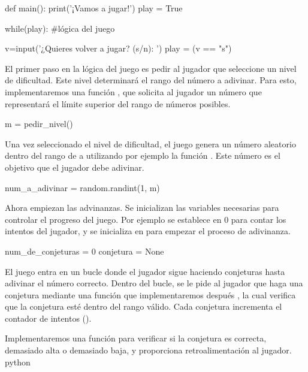 \begin{python}
def main():
    print('¡Vamos a jugar!')
    play = True
    
    while(play):
        #lógica del juego

        v=input('¿Quieres volver a jugar? (s/n): ')
        play = (v == "s")
\end{python}


El primer paso en la lógica del juego es pedir al jugador que seleccione un nivel de dificultad. Este nivel determinará el rango del número a adivinar. Para esto, implementaremos una función , que solicita al jugador un número que representará el límite superior del rango de números posibles.

\begin{python}
m = pedir_nivel()
\end{python}

Una vez seleccionado el nivel de dificultad, el juego genera un número aleatorio dentro del rango de  a  utilizando por ejemplo la función . Este número es el objetivo que el jugador debe adivinar.

\begin{python}
num_a_adivinar = random.randint(1, m)    
\end{python}

Ahora empiezan las advinanzas. Se inicializan las variables necesarias para controlar el progreso del juego. Por ejemplo  se establece en 0 para contar los intentos del jugador, y  se inicializa en  para empezar el proceso de adivinanza.

\begin{python}
num_de_conjeturas = 0
conjetura = None
\end{python}

El juego entra en un bucle donde el jugador sigue haciendo conjeturas hasta adivinar el número correcto.
Dentro del bucle, se le pide al jugador que haga una conjetura mediante una función que implementaremos después , la cual verifica que la conjetura esté dentro del rango válido.
Cada conjetura incrementa el contador de intentos ().

Implementaremos una función  para verificar si la conjetura es correcta, demasiado alta o demasiado baja, y proporciona retroalimentación al jugador.
python

